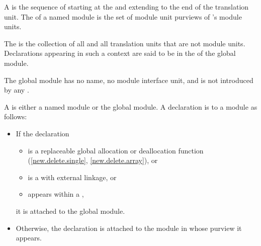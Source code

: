 \pnum
A  is
the sequence of 
starting at the 
and extending to the end of the translation unit.
The 
of a named module  is the set of module unit purviews
of 's module units.

\pnum
The  is the collection of all
and all translation units that are not module units.
Declarations appearing in such a context
are said to be in the  of the global module.
\begin{note}
The global module has no name, no module interface unit, and is not
introduced by any .
\end{note}

\pnum
A  is either a named module or the global module.
A declaration is  to a module as follows:
\begin{itemize}
\item If the declaration
\begin{itemize}
\item is a replaceable global allocation or deallocation
function (\ref{new.delete.single}, \ref{new.delete.array}), or
\item is a  with external linkage, or
\item appears within a ,
\end{itemize}
it is attached to the global module.

\item Otherwise, the declaration is
attached to the module in whose purview it appears.
\end{itemize}

